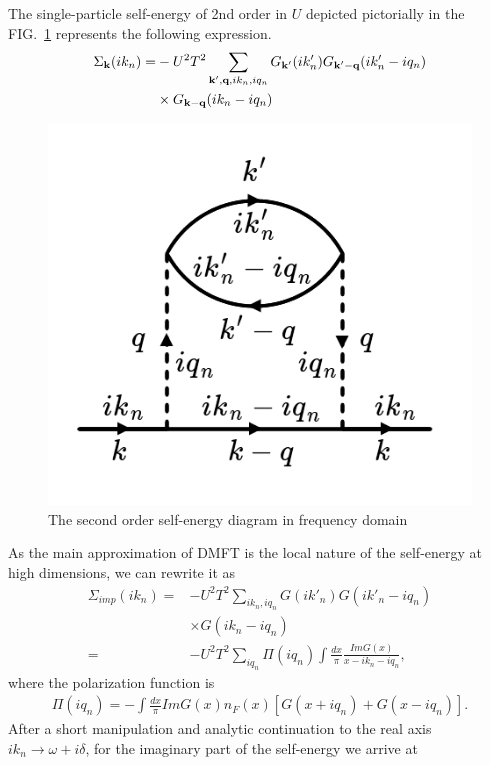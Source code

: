\documentclass[aps,prl,twocolumn,showpacs,floatfix,superscriptaddress]{revtex4-1}
\begin{document}
The single-particle self-energy of 2nd order in $U$ depicted pictorially in the FIG.~\ref{fig:2} represents the following expression.
\begin{align}
\Sigma_{\textbf k}(ik_n) =& -{U^2 T^2}\sum_{\textbf{k}',\textbf{q},ik_n,iq_n}G_{\textbf{k}'}(ik'_n)G_{\textbf{k}'-\textbf{q}}(ik'_n-iq_n)\nonumber\\
&\times G_{\textbf{k}-\textbf{q}}(ik_n-iq_n)
\end{align}
	\begin{figure}
		\includegraphics[scale=0.3,angle=0]{matsubara}
		\caption{The second order self-energy diagram in frequency domain}
		\label{fig:2}
	\end{figure}

As the main approximation of DMFT is the local nature of the self-energy at high dimensions, we can rewrite it as
\begin{align}
\Sigma_{imp}(ik_n) =& -{U^2 T^2}\sum_{ik_n,iq_n}G(ik'_n)G(ik'_n-iq_n)\nonumber\\
&\times G(ik_n-iq_n)\\
=&-U^2 T^2 \sum_{iq_n}\Pi(iq_n)\int \frac{dx}{\pi}\frac{ImG(x)}{x-ik_n-iq_n},
\end{align}
where the polarization function is 
\begin{align}
\Pi(iq_n) = - \int \frac{dx}{\pi}ImG(x)n_F(x)[G(x+iq_n) + G(x - iq_n)].
\end{align}
After a short manipulation and analytic continuation to the real axis $ik_n \rightarrow \omega + i\delta$, for the imaginary part of the self-energy we arrive at
\end{document}
